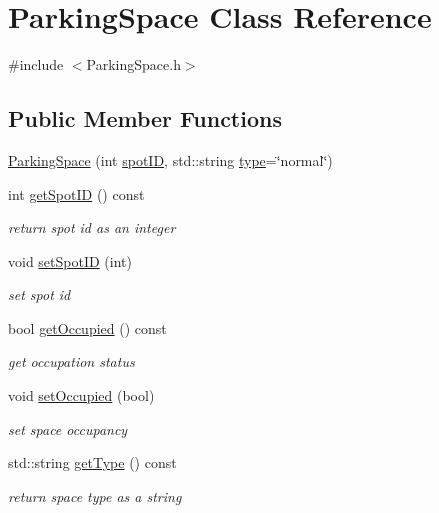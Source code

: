 \hypertarget{class_parking_space}{}\section{Parking\+Space Class Reference}
\label{class_parking_space}


{\ttfamily \#include $<$Parking\+Space.\+h$>$}

\subsection*{Public Member Functions}
\begin{DoxyCompactItemize}
\item 
\mbox{\hyperlink{class_parking_space_af466c9e05b01e570ea19ef671846a40a}{Parking\+Space}} (int \mbox{\hyperlink{class_parking_space_a73726147c4a69b71b004642fa7be3cf5}{spot\+ID}}, std\+::string \mbox{\hyperlink{class_parking_space_abe337abebed765d6255afc5d6d6a907e}{type}}=\char`\"{}normal\char`\"{})
\item 
int \mbox{\hyperlink{class_parking_space_a8f250e7f0d01332b36c117b7c9ee0982}{get\+Spot\+ID}} () const
\begin{DoxyCompactList}\small\item\em return spot id as an integer \end{DoxyCompactList}\item 
void \mbox{\hyperlink{class_parking_space_a9acf2d76a9b9f84d049b44dd0d4a5c8b}{set\+Spot\+ID}} (int)
\begin{DoxyCompactList}\small\item\em set spot id \end{DoxyCompactList}\item 
bool \mbox{\hyperlink{class_parking_space_afc40502f401e7689685be6248c2ce097}{get\+Occupied}} () const
\begin{DoxyCompactList}\small\item\em get occupation status \end{DoxyCompactList}\item 
void \mbox{\hyperlink{class_parking_space_ab535bca076add6abc31048ea8aff5719}{set\+Occupied}} (bool)
\begin{DoxyCompactList}\small\item\em set space occupancy \end{DoxyCompactList}\item 
std\+::string \mbox{\hyperlink{class_parking_space_a93d7ebecb8409d606f74504449518e99}{get\+Type}} () const
\begin{DoxyCompactList}\small\item\em return space type as a string \end{DoxyCompactList}\item 

\end{DoxyCompactItemize}
